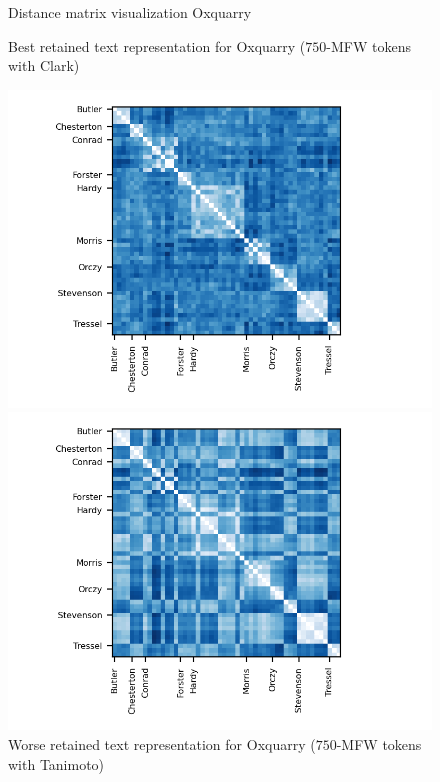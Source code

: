 \begin{figure}
  \caption{Distance matrix visualization Oxquarry}
  \label{fig:distances_matrix_oxquarry}

  \caption{Best retained text representation for Oxquarry ($750$-MFW tokens with Clark)}
  \label{fig:distance_matrix_oxquarry_clark}
  \includegraphics{img/distance_matrix_oxquarry_clark.png}

  \vspace{0.5cm}

  \caption{Worse retained text representation for Oxquarry ($750$-MFW tokens with Tanimoto)}
  \label{fig:distance_matrix_oxquarry_tanimoto}
  \includegraphics{img/distance_matrix_oxquarry_tanimoto.png}
\end{figure}


